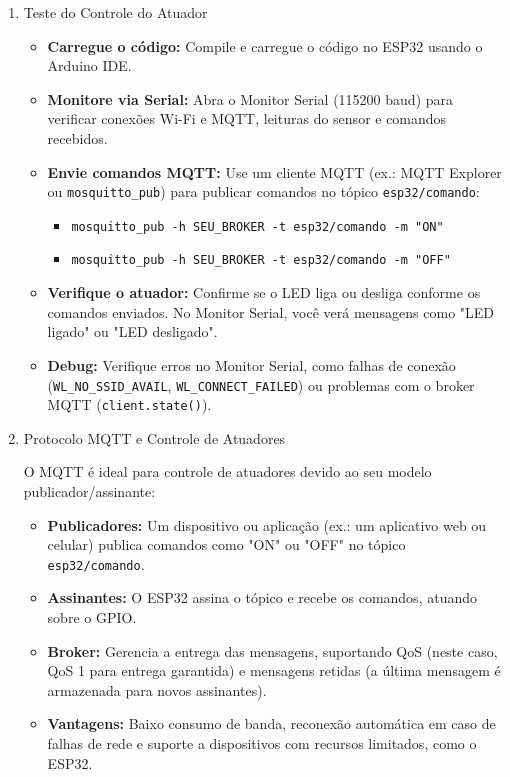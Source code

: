 \documentclass[a4paper]{article}
\begin{document}
\begin{answer}
\begin{enumerate}
            \item{Teste do Controle do Atuador}

                \begin{itemize}
                    \item \textbf{Carregue o código:} Compile e carregue o código no ESP32 usando o Arduino IDE.
                    \item \textbf{Monitore via Serial:} Abra o Monitor Serial (115200 baud) para verificar conexões Wi-Fi e MQTT, leituras do sensor e comandos recebidos.
                    \item \textbf{Envie comandos MQTT:} Use um cliente MQTT (ex.: MQTT Explorer ou \texttt{mosquitto\_pub}) para publicar comandos no tópico \texttt{esp32/comando}:
                    \begin{itemize}
                        \item \texttt{mosquitto\_pub -h SEU\_BROKER -t esp32/comando -m "ON"}
                        \item \texttt{mosquitto\_pub -h SEU\_BROKER -t esp32/comando -m "OFF"}
                    \end{itemize}
                    \item \textbf{Verifique o atuador:} Confirme se o LED liga ou desliga conforme os comandos enviados. No Monitor Serial, você verá mensagens como "LED ligado" ou "LED desligado".
                    \item \textbf{Debug:} Verifique erros no Monitor Serial, como falhas de conexão (\texttt{WL\_NO\_SSID\_AVAIL}, \texttt{WL\_CONNECT\_FAILED}) ou problemas com o broker MQTT (\texttt{client.state()}).
                \end{itemize}

            \item{Protocolo MQTT e Controle de Atuadores}

                O MQTT é ideal para controle de atuadores devido ao seu modelo publicador/assinante:
                \begin{itemize}
                    \item \textbf{Publicadores:} Um dispositivo ou aplicação (ex.: um aplicativo web ou celular) publica comandos como "ON" ou "OFF" no tópico \texttt{esp32/comando}.
                    \item \textbf{Assinantes:} O ESP32 assina o tópico e recebe os comandos, atuando sobre o GPIO.
                    \item \textbf{Broker:} Gerencia a entrega das mensagens, suportando QoS (neste caso, QoS 1 para entrega garantida) e mensagens retidas (a última mensagem é armazenada para novos assinantes).
                    \item \textbf{Vantagens:} Baixo consumo de banda, reconexão automática em caso de falhas de rede e suporte a dispositivos com recursos limitados, como o ESP32.
                \end{itemize}


\end{enumerate}
\end{answer}
\end{document}

